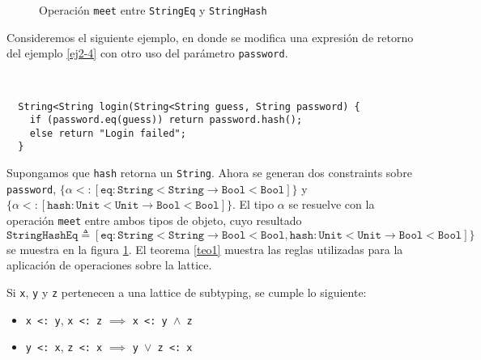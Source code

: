\begin{figure}[ht]
  \centering
  \caption{Operación \texttt{meet} entre \texttt{StringEq} y \texttt{StringHash}}
  \label{latticeInference}
\end{figure}

Consideremos el siguiente ejemplo, en donde se modifica una expresión de retorno del ejemplo \ref{ej2-4} con otro uso del parámetro \texttt{password}.

\begin{ej} \ \\
  \normalfont
  \label{ej2-5}
\begin{lstlisting}
  String<String login(String<String guess, String password) {
  	if (password.eq(guess)) return password.hash();
  	else return "Login failed";
  }
\end{lstlisting}
\end{ej}

Supongamos que \texttt{hash} retorna un \texttt{String}. Ahora se generan dos constraints sobre \texttt{password}, $\{\alpha <: [\mathtt{eq} : \mathtt{String<String} \rightarrow \mathtt{Bool<Bool}]\}$ y $\{\alpha <: [\mathtt{hash} : \mathtt{Unit<Unit} \rightarrow \mathtt{Bool<Bool}]\}$. El tipo $\alpha$ se resuelve con la operación \texttt{meet} entre ambos tipos de objeto, cuyo resultado $\mathtt{StringHashEq} \triangleq [\mathtt{eq} : \mathtt{String<String} \rightarrow \mathtt{Bool<Bool}, \mathtt{hash} : \mathtt{Unit<Unit} \rightarrow \mathtt{Bool<Bool}]\}$ se muestra en la figura \ref{latticeInference}. El teorema \ref{teo1} muestra las reglas utilizadas para la aplicación de operaciones sobre la lattice.

\begin{teo} \label{teo1} \normalfont Si \texttt{x}, \texttt{y} y \texttt{z} pertenecen a una lattice de subtyping, se cumple lo siguiente: \\
  \begin{itemize}
    \item \texttt{x <: y}, \texttt{x <: z} $\implies$ \texttt{x <: y }$\wedge$\texttt{ z}
    \item \texttt{y <: x}, \texttt{z <: x} $\implies$ \texttt{y }$\vee$\texttt{ z <: x}
  \end{itemize}
\end{teo}
